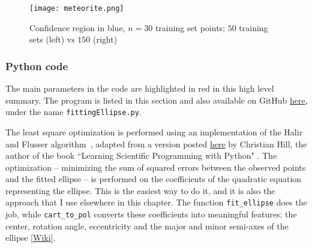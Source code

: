 \documentclass[oneside,10pt]{book}
\begin{document}
\begin{figure}[H]
\centering
\texttt{[image: meteorite.png]}  
\caption{Confidence region in blue, $n=30$ training set points; $50$ training sets (left) vs $150$ (right)}
\label{fig:meteor}
\end{figure}




\subsubsection{Python code}\label{pipybv}

The main parameters in the code are highlighted in red in this high level summary. The program 
  is listed in this section and also available on GitHub 
\href{https://github.com/VincentGranville/Machine-Learning/blob/main/Source\%20Code/fittingEllipse.py}{here},
 under the name \texttt{fittingEllipse.py}.

The least square optimization is performed using an implementation of  the Halir and Flusser algorithm~\cite{Halir98numericallystable}, adapted from a version posted 
 \href{https://scipython.com/blog/direct-linear-least-squares-fitting-of-an-ellipse/}{here} by Christian Hill, the author of the book
``Learning Scientific Programming with Python" \cite{chsp2016}. The optimization -- minimizing the sum of squared errors between the observed points and the fitted ellipse -- is performed on the coefficients of the quadratic equation representing the ellipse.
 This is the easiest way to do it, and it is also the approach that I use elsewhere in this chapter. 
 The function \texttt{fit\_ellipse} does the job, while \texttt{cart\_to\_pol} converts these coefficients into meaningful features: the center, rotation angle, eccentricity and the major and minor semi-axes of the ellipse [\href{https://simple.wikipedia.org/wiki/Semi-major_and_semi-minor_axes}{Wiki}]. \vspace{1ex}

 
\vspace{1ex}
\end{document}
